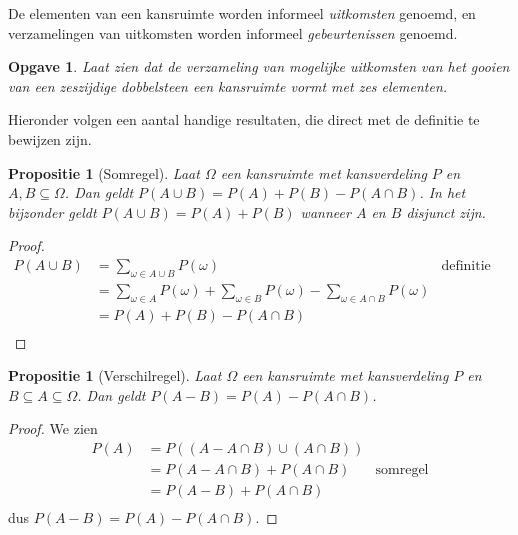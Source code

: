 \documentclass[a4paper]{book}
\newtheorem{proposition}[theorem]{Propositie}
\newtheorem{exercise}[theorem]{Opgave}
\theoremstyle{definition}
\begin{document}
De elementen van een kansruimte worden informeel \emph{uitkomsten} genoemd, en verzamelingen van uitkomsten worden informeel \emph{gebeurtenissen}
genoemd.

\begin{exercise}
    Laat zien dat de verzameling van mogelijke uitkomsten van het gooien van een zeszijdige dobbelsteen een kansruimte vormt met zes elementen.
\end{exercise}

Hieronder volgen een aantal handige resultaten, die direct met de definitie te bewijzen zijn.
\begin{proposition}[Somregel]\label{somregel}
    Laat $\Omega$ een kansruimte met kansverdeling $P$ en $A,B \subseteq \Omega$.
    Dan geldt $P(A \cup B) = P(A) + P(B) - P(A \cap B)$.
    In het bijzonder geldt $P(A \cup B) = P(A) + P(B)$ wanneer $A$ en $B$ disjunct zijn.
\end{proposition}
\begin{proof}
    \begin{align*}
        P(A \cup B)     &= \sum_{\omega \in A \cup B} P(\omega) & \text{definitie kansverdeling}\\
                        &= \sum_{\omega \in A} P(\omega) + \sum_{\omega \in B} P(\omega) - \sum_{\omega \in A \cap B} P(\omega) \\
                        &= P(A) + P(B) - P(A \cap B) \\
    \end{align*}
\end{proof}

\begin{proposition}[Verschilregel]\label{verschilregel}
    Laat $\Omega$ een kansruimte met kansverdeling $P$ en $B \subseteq A \subseteq \Omega$.
    Dan geldt $P(A - B) = P(A) - P(A \cap B) $.
\end{proposition}
\begin{proof}
    We zien
    \begin{align*}
        P(A)    &= P( (A - A \cap B) \cup (A \cap B) ) \\
                &= P(A - A \cap B ) + P(A \cap B) & \text{somregel} \\
                &= P(A - B) + P(A \cap B) \\
    \end{align*}
    dus $P(A - B) = P(A) - P(A \cap B) $.
\end{proof}
\end{document}
